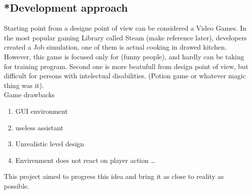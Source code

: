 \documentclass[18pt]{article}
\numberwithin{equation}{section} %
\numberwithin{figure}{section} %
\numberwithin{table}{section} %
\begin{document}
	\subsection{*Development approach}
	Starting point from a designe point of view can be considered a Video Games. In the most popular gaming Library called Steam (make reference later), developers created a Job simulation, one of them is actual cooking in drawed kitchen. However, this game is focused only for (funny people), and hardly can be taking for training program. Second one is more beatufull from design point of view, but difficult for persons with intelectual disabilities. (Potion game or whatever magic thing was it). \\
	
	Game drawbacks
	\begin{enumerate}
		\item GUI environment
		\item useless assistant
		\item Unrealistic level design
		\item Envirenment does not react on player action
		\ldots
	\end{enumerate}

	This project aimed to progress this idea and bring it as close to reality as possible. \\
	
\end{document}
